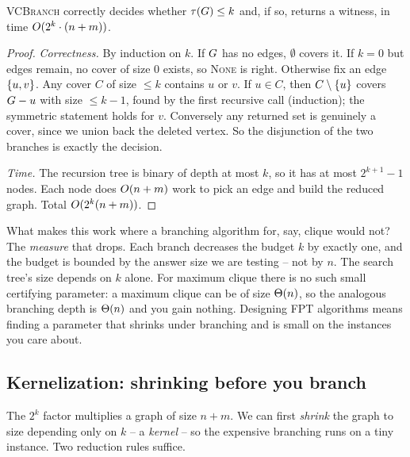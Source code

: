 \begin{theorem}
\label{ch29:thm-fpt}
\textsc{VCBranch} correctly decides whether $\tau(G)\le k$ and, if so, returns
a witness, in time $O(2^k\cdot(n+m))$.
\end{theorem}

\begin{proof}
\emph{Correctness.} By induction on $k$. If $G$ has no edges, $\emptyset$
covers it. If $k=0$ but edges remain, no cover of size $0$ exists, so
\textsc{None} is right. Otherwise fix an edge $\{u,v\}$. Any cover $C$ of size
$\le k$ contains $u$ or $v$. If $u\in C$, then $C\setminus\{u\}$ covers
$G-u$ with size $\le k-1$, found by the first recursive call (induction); the
symmetric statement holds for $v$. Conversely any returned set is genuinely a
cover, since we union back the deleted vertex. So the disjunction of the two
branches is exactly the decision.

\emph{Time.} The recursion tree is binary of depth at most $k$, so it has at most
$2^{k+1}-1$ nodes. Each node does $O(n+m)$ work to pick an edge and build the
reduced graph. Total $O(2^k(n+m))$.
\end{proof}

\begin{whybox}
What makes this work where a branching algorithm for, say, clique would not? The
\emph{measure} that drops. Each branch decreases the budget $k$ by exactly one,
and the budget is bounded by the answer size we are testing -- not by $n$. The
search tree's size depends on $k$ alone. For maximum clique there is no such
small certifying parameter: a maximum clique can be of size $\Theta(n)$, so the
analogous branching depth is $\Theta(n)$ and you gain nothing. Designing FPT algorithms
means finding a parameter that shrinks under branching and is small on the
instances you care about.
\end{whybox}

\subsection{Kernelization: shrinking before you branch}
\label{ch29:kernel}

The $2^k$ factor multiplies a graph of size $n+m$. We can first \emph{shrink} the
graph to size depending only on $k$ -- a \emph{kernel} -- so the expensive
branching runs on a tiny instance. Two reduction rules suffice.

